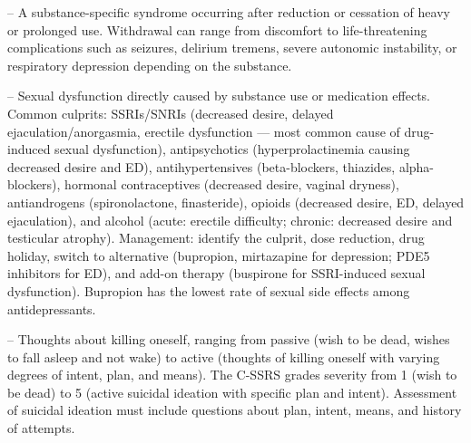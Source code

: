 -- A substance-specific syndrome occurring after reduction or cessation of heavy or prolonged use. Withdrawal can range from discomfort to life-threatening complications such as seizures, delirium tremens, severe autonomic instability, or respiratory depression depending on the substance.

-- Sexual dysfunction directly caused by substance use or medication effects. Common culprits: SSRIs/SNRIs (decreased desire, delayed ejaculation/anorgasmia, erectile dysfunction — most common cause of drug-induced sexual dysfunction), antipsychotics (hyperprolactinemia causing decreased desire and ED), antihypertensives (beta-blockers, thiazides, alpha-blockers), hormonal contraceptives (decreased desire, vaginal dryness), antiandrogens (spironolactone, finasteride), opioids (decreased desire, ED, delayed ejaculation), and alcohol (acute: erectile difficulty; chronic: decreased desire and testicular atrophy). Management: identify the culprit, dose reduction, drug holiday, switch to alternative (bupropion, mirtazapine for depression; PDE5 inhibitors for ED), and add-on therapy (buspirone for SSRI-induced sexual dysfunction). Bupropion has the lowest rate of sexual side effects among antidepressants.

-- Thoughts about killing oneself, ranging from passive (wish to be dead, wishes to fall asleep and not wake) to active (thoughts of killing oneself with varying degrees of intent, plan, and means). The C-SSRS grades severity from 1 (wish to be dead) to 5 (active suicidal ideation with specific plan and intent). Assessment of suicidal ideation must include questions about plan, intent, means, and history of attempts.

